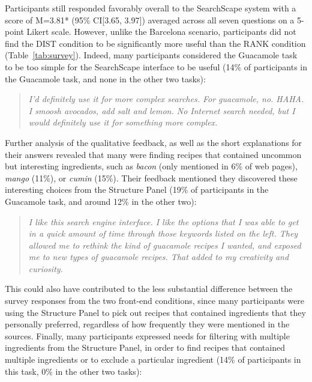 Participants still responded favorably overall to the SearchScape system with a score of M=3.81* (95\% CI[3.65, 3.97]) averaged across all seven questions on a 5-point Likert scale. However, unlike the Barcelona scenario, participants did not find the DIST condition to be significantly more useful than the RANK condition (Table~\ref{tab:survey}). 
Indeed, many participants considered the Guacamole task to be too simple for the SearchScape interface to be useful (14\% of participants in the Guacamole task, and none in the other two tasks): 


\blockquote{\emph{I'd definitely use it for more complex searches. For guacamole, no. HAHA. I smoosh avocados, add salt and lemon. No Internet search needed, but I would definitely use it for something more complex.}}

Further analysis of the qualitative feedback, as well as the short explanations for their answers revealed that many were finding recipes that contained uncommon but interesting ingredients, such as \emph{bacon} (only mentioned in 6\% of web pages), \emph{mango} (11\%), or \emph{cumin} (15\%). Their feedback mentioned they discovered these interesting choices from the Structure Panel (19\% of participants in the Guacamole task, and around 12\% in the other two): 


\blockquote{\emph{I like this search engine interface. I like the options that I was able to get in a quick amount of time through those keywords listed on the left. They allowed me to rethink the kind of guacamole recipes I wanted, and exposed me to new types of guacamole recipes. That added to my creativity and curiosity.}}


This could also have contributed to the less substantial difference between the survey responses from the two front-end conditions, since many participants were using the Structure Panel to pick out recipes that contained ingredients that they personally preferred, regardless of how frequently they were mentioned in the sources. 
Finally, many participants expressed needs for filtering with multiple ingredients from the Structure Panel, in order to find recipes that contained multiple ingredients or to exclude a particular ingredient (14\% of participants in this task, 0\% in the other two tasks):


